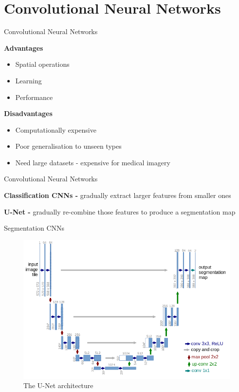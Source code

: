 \documentclass[10pt]{beamer}
\begin{document}
\section{Convolutional Neural Networks}

\begin{frame}[fragile]{Convolutional Neural Networks}

  \textbf{Advantages}
  \begin{itemize}
  \item Spatial operations
  \item Learning
  \item Performance
  \end{itemize}

  \textbf{Disadvantages}
  \begin{itemize}
  \item Computationally expensive
  \item Poor generalisation to unseen types
  \item Need large datasets - expensive for medical imagery
  \end{itemize}
  
\end{frame}

\begin{frame}[fragile]{Convolutional Neural Networks}

  \textbf{Classification CNNs -} gradually extract larger features from smaller ones

  \pause
  \textbf{U-Net -} gradually re-combine those features to produce a segmentation map
  
\end{frame}


\begin{frame}[fragile]{Segmentation CNNs}

  \begin{figure}[h!]
    \centering
    \includegraphics[scale=0.40]{pictures/U-Net}
    \caption{The U-Net architecture}
    \label{fig:minCut}
  \end{figure}
  
\end{frame}
\end{document}
